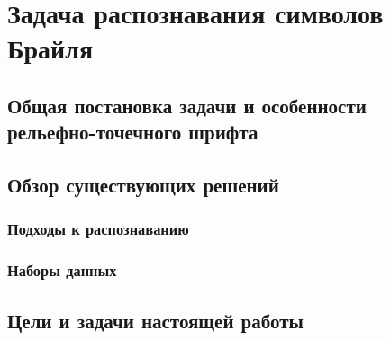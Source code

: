 \documentclass{main.tex}[subfiles]
\begin{document}
\section{Задача распознавания символов Брайля}
\subsection{Общая постановка задачи и особенности рельефно-точечного шрифта}
\subsection{Обзор существующих решений}
\subsubsection{Подходы к распознаванию}

\cite{li2020braunet}
\cite{ovodov2020}
\cite{ovodov2021}
\cite{alsalman2021}
\cite{ortoncelli2021}

\subsubsection{Наборы данных}

\subsection{Цели и задачи настоящей работы}
\end{document}
